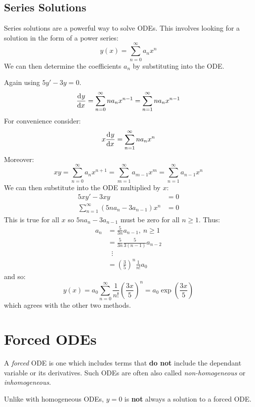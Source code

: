 \documentclass[../main.tex]{subfiles}
\begin{document}
\subsection{Series Solutions}
Series solutions are a powerful way to solve ODEs.
This involves looking for a solution in the form of a power series:
\[
  y(x) = \sum_{n=0}^{\infty} a_n x^{n}
\]
We can then determine the coefficients $a_n$ by substituting into the ODE.
\begin{example}
  Again using $5y' - 3y = 0$.
  \[
    \deriv{y}{x} = \sum_{n=0}^{\infty} na_n x^{n-1} = \sum_{n=1}^{\infty} na_nx^{n-1}
  \]
  For convenience consider:
  \[
    x \deriv{y}{x} = \sum_{n=1}^{\infty} na_n x^{n}
  \]
  Moreover:
  \[
    xy = \sum_{n=0}^{\infty} a_n x^{n + 1} = \sum_{m = 1}^{\infty} a_{m-1}x^{m} = \sum_{n = 1}^{\infty} a_{n-1}x^{n}
  \]
  We can then substitute into the ODE multiplied by $x$:
  \begin{align*}
    5xy' - 3xy &= 0 \\
    \sum_{n=1}^{\infty} (5na_n - 3a_{n-1})x^{n} &= 0
  \end{align*}
  This is true for all $x$ so $5na_n - 3a_{n-1}$ must be zero for all $n \geq 1$.
  Thus:
  \begin{align*}
    a_n &= \frac{5}{3n}a_{n-1},\ n\geq1 \\
        &= \frac{5}{3n}\frac{5}{3(n-1)}a_{n-2} \\
        &\;\;\vdots \\
        &= \left(\frac{3}{5}\right)^{n} \frac{1}{n!}a_0
  \end{align*}
  and so:
  \[
    y(x) = a_0 \sum_{n=0}^{\infty} \frac{1}{n!}\left(\frac{3x}{5}\right)^{n} = a_0 \exp\left(\frac{3x}{5}\right)
  \]
  which agrees with the other two methods.
\end{example}
\section{Forced ODEs}
\begin{definition}[Forced]
  A \textit{forced} ODE is one which includes terms that \textbf{do not} include the dependant variable or its derivatives.
  Such ODEs are often also called \textit{non-homogeneous} or \textit{inhomogeneous}.
\end{definition}
\begin{remark}
  Unlike with homogeneous ODEs, $y = 0$ is \textbf{not} always a solution to a forced ODE.
\end{remark}
\end{document}
